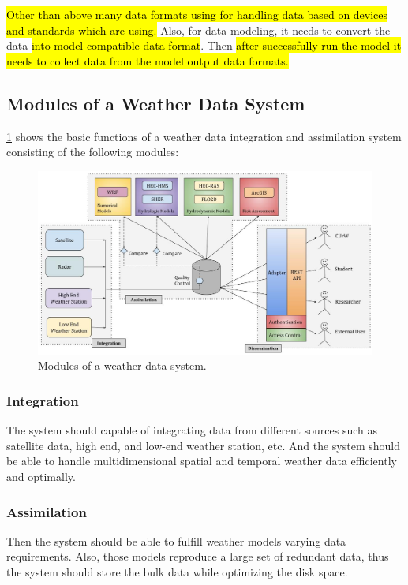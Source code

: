 \hl{Other than above many data formats using for handling data based on devices and standards which are using.} Also, for data modeling, it needs to convert the data \hl{into model compatible data format}. Then \hl{after successfully run the model it needs to collect data from the model output data formats.}

\subsection{Modules of a Weather Data System}
\label{subse:modules_weather_data_integration_sys}

\cref{fi:wdia_components} shows the basic functions of a weather data integration and assimilation system consisting of the following modules:

\begin{figure}[htbp]
\centerline{\includegraphics[width=1\textwidth]{method/misc/weather_data_system_components.jpg}}
\caption{Modules of a weather data system.}
\label{fi:wdia_components}
\end{figure}

\subsubsection{Integration}
The system should capable of integrating data from different sources such as satellite data, high end, and low-end weather station, etc. And the system should be able to handle multidimensional spatial and temporal weather data efficiently and optimally. 
\subsubsection{Assimilation}
Then the system should be able to fulfill weather models varying data requirements. Also, those models reproduce a large set of redundant data, thus the system should store the bulk data while optimizing the disk space.
